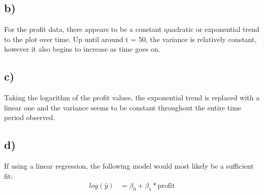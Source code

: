 \documentclass[paper=a4, fontsize=11pt]{scrartcl} %
\numberwithin{equation}{section} %
\numberwithin{figure}{section} %
\numberwithin{table}{section} %
\begin{document}
\subsection*{b)}
For the profit data, there appears to be a constant quadratic or exponential trend to the plot over time. Up until around t = 50, the variance is relatively constant, however it also begins to increase as time goes on.

\subsection*{c)}
Taking the logarithm of the profit values, the exponential trend is replaced with a linear one and the variance seems to be constant throughout the entire time period observed.



\subsection*{d)}
If using a linear regression, the following model would most likely be a sufficient fit:
\begin{align*}
	log(\hat{y}) &= \beta_0 + \beta_1 * \text{profit}
\end{align*}
\end{document}
